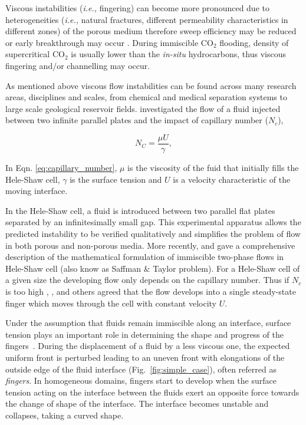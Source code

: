 \documentclass[preprint,authoryear,12pt]{elsarticle}
\newcommand{\ie}{{\it i.e., }}
\begin{document}
\medskip
Viscous instabilities (\ie fingering) can become more pronounced due to heterogeneities (\ie natural fractures, different permeability characteristics in different zones) of the porous medium therefore sweep efficiency may be reduced or early breakthrough may occur \citep{riaz_2004, tavassoli_2015}. During immiscible CO$_{2}$ flooding, density of supercritical CO$_{2}$ is usually lower than the \textit{in-situ} hydrocarbons, thus viscous fingering and/or channelling may occur.  

\medskip
As mentioned above viscous flow instabilities can be found across many research areas, disciplines and scales, from chemical and medical separation systems to large scale geological reservoir fields. \citet{muskat_1934} investigated the flow of a fluid injected between two infinite parallel plates and the impact of capillary number ($N_{c}$),
 
\begin{equation}
N_{C} = \frac{\mu U}{\gamma},
\label{eq:capillary_number}
\end{equation}

\noindent In Eqn. \ref{eq:capillary_number}, $\mu$ is the viscosity of the fuid that initially fills the Hele-Shaw cell, $\gamma$ is the surface tension and $U$ is a velocity characteristic of the moving interface.

\medskip
In the Hele-Shaw cell, a fluid is introduced between two parallel flat plates separated by an infinitesimally small gap. This experimental apparatus allows the predicted instability to be verified qualitatively and simplifies the problem of flow in both porous and non-porous media.   
More recently, \citet{howison_2000} and \citet{praud_2005} gave a comprehensive description of the mathematical formulation of immiscible two-phase flows in Hele-Shaw cell (also know as Saffman $\&$ Taylor problem). For a Hele-Shaw cell of a given size the developing flow only depends on the capillary number. Thus if \textit{$N_{c}$} is too high \citet{saffman_1959}, \citet{homsy_1987}, \citet{tabeling_1987} and others agreed that the flow develops into a single steady-state finger which moves through the cell with constant velocity $U$.

\medskip
 Under the assumption that fluids remain immiscible along an interface, surface tension plays an important role in determining the shape and progress of the fingers~\citep{howison_2000}. During the displacement of a fluid by a less viscous one, the expected uniform front is perturbed %
leading to an uneven front with elongations of the outside edge of the fluid interface (Fig.~\ref{fig:simple_case}), often referred as \textit{fingers}. In homogeneous domains, fingers start to develop when the surface tension acting on the interface between the fluids exert an opposite force towards the change of shape of the interface. The interface becomes unstable and collapses, taking a curved shape. 
\end{document}
